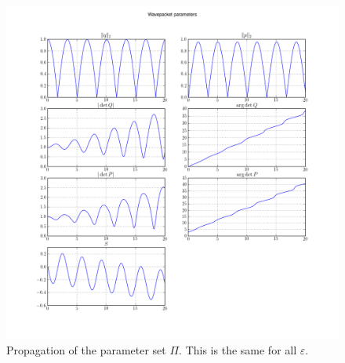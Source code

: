 \begin{figure}
  \centering
  \includegraphics[width=\linewidth]{./results/config_cos_2_packets_case1/wavepacket_parameters_abs_ang_block0.png}
  \caption{Propagation of the parameter set $\Pi$. This is the same for all $\varepsilon$.}
  \label{fig:trosional_parameter_evolution}
\end{figure}

